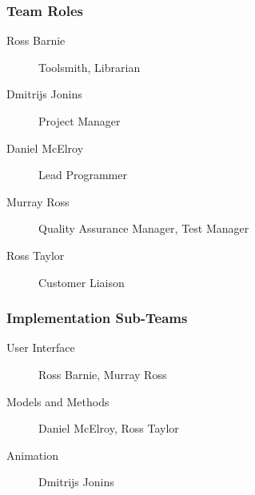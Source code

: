 \begin{frame}
\frametitle{Team Roles}

\begin{description}
\item[Ross Barnie]{Toolsmith, Librarian}
\item[Dmitrijs Jonins]{Project Manager}
\item[Daniel McElroy]{Lead Programmer}
\item[Murray Ross]{Quality Assurance Manager, Test Manager}	
\item[Ross Taylor]{Customer Liaison}
\end{description}

\end{frame}

\begin{frame}
\frametitle{Implementation Sub-Teams}

\begin{description}
\item[User Interface]{Ross Barnie, Murray Ross}
\item[Models and Methods]{Daniel McElroy, Ross Taylor}
\item[Animation]{Dmitrijs Jonins}
\end{description}

\end{frame}
